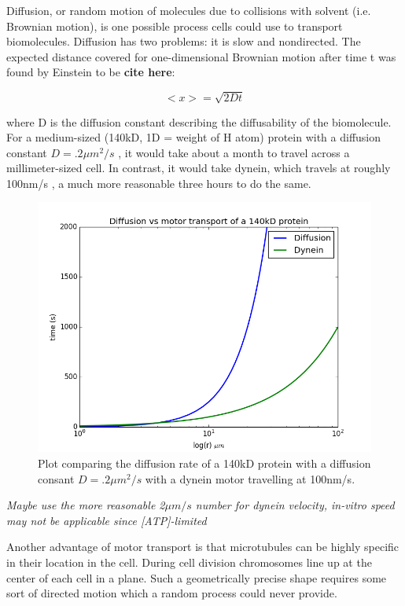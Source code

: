 \documentclass[10pt]{article} %
\begin{document}
Diffusion, or random motion of molecules due to collisions with solvent (i.e. Brownian motion), is one possible process cells could use to transport biomolecules. Diffusion has two problems: it is slow and nondirected. The expected distance covered for one-dimensional Brownian motion after time t was found by Einstein to be \textbf{cite here}:

\begin{equation}
  \label{diffusion-equation}
  <x> = \sqrt{2Dt}
\end{equation}

where D is the diffusion constant describing the diffusability of the biomolecule. For a medium-sized (140kD, 1D = weight of H atom) protein with a diffusion constant $D = .2 \mu m^2/s$ %
, it would take about a month to travel across a millimeter-sized cell. In contrast, it would take dynein, which travels at roughly 100nm/s \cite{weihongpaper}, a much more reasonable three hours to do the same.

\begin{figure}[h]
  \centering
  \includegraphics[width=.65\textwidth,keepaspectratio]{../../figures/diffusion_vs_dynein.png}
  \caption{Plot comparing the diffusion rate of a 140kD protein with a diffusion consant $D = .2 \mu m^2/s$ with a dynein motor travelling at 100nm/s.}
  \label{diffusion_vs_dynein}
\end{figure}

\textit{Maybe use the more reasonable 2$\mu m / s$ number for dynein velocity, in-vitro speed may not be applicable since [ATP]-limited}

Another advantage of motor transport is that microtubules can be highly specific in their location in the cell. During cell division chromosomes line up at the center of each cell in a plane. Such a geometrically precise shape requires some sort of directed motion which a random process could never provide.\\
\end{document}
